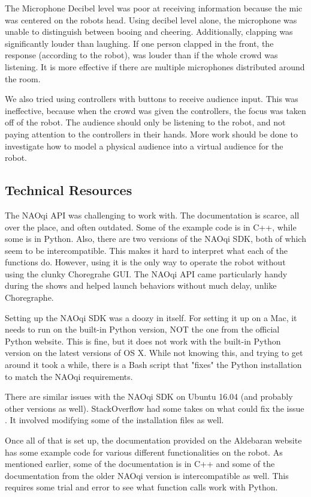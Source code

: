     The Microphone Decibel level was poor at receiving information because the mic was centered on the robots head.
    Using decibel level alone, the microphone was unable to distinguish between booing and cheering.
    Additionally, clapping was significantly louder than laughing. 
    If one person clapped in the front, the response (according to the robot), was louder than if the whole crowd was listening.
    It is more effective if there are multiple microphones distributed around the room.


    We also tried using controllers with buttons to receive audience input.
    This was ineffective, because when the crowd was given the controllers, the focus was taken off of the robot.
    The audience should only be listening to the robot, and not paying attention to the controllers in their hands.
    More work should be done to investigate how to model a physical audience into a virtual audience for the robot.

\subsection{Technical Resources}

    The NAOqi API was challenging to work with. The documentation is scarce, all over the place, and often outdated.
    Some of the example code is in C++, while some is in Python. Also, there are two versions of the NAOqi SDK, both of which seem to be intercompatible.
    This makes it hard to interpret what each of the functions do.
    However, using it is the only way to operate the robot without using the clunky Choregrahe GUI. 
    The NAOqi API came particularly handy during the shows and helped launch behaviors without much delay, unlike Choregraphe.

    Setting up the NAOqi SDK was a doozy in itself. For setting it up on a Mac, it needs to run on the built-in Python version, 
    NOT the one from the official Python website. This is fine, but it does not work with the built-in Python version on the latest versions of OS X.
    While not knowing this, and trying to get around it took a while, there is a Bash script \cite{BashScript}
    that "fixes" the Python installation to match the NAOqi requirements. 

    There are similar issues with the NAOqi SDK on Ubuntu 16.04 (and probably other versions as well). StackOverflow had some takes 
    on what could fix the issue \cite{naoUbuntu}. It involved modifying some of the installation files as well.

    Once all of that is set up, the documentation provided on the Aldebaran website \cite{AldebaranDoc} has some example code for various different functionalities on the robot.
    As mentioned earlier, some of the documentation is in C++ and some of the documentation from the older NAOqi version is intercompatible as well. 
    This requires some trial and error to see what function calls work with Python.
